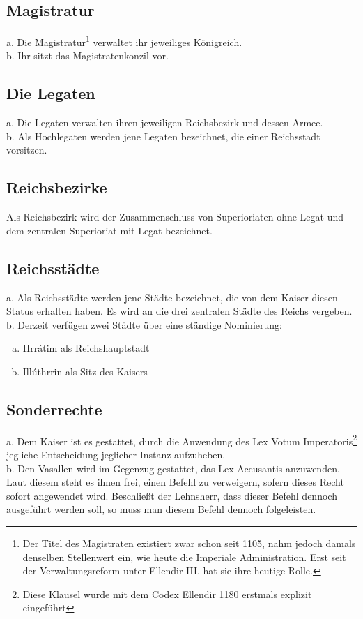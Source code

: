 \documentclass{article}
\begin{document}
\subsection{Magistratur}
a. Die Magistratur\footnote{Der Titel des Magistraten existiert zwar schon seit 1105, nahm jedoch damals denselben Stellenwert ein, wie heute die Imperiale Administration. Erst seit der Verwaltungsreform unter Ellendir III. hat sie ihre heutige Rolle.} verwaltet ihr jeweiliges Königreich.  \\
b. Ihr sitzt das Magistratenkonzil vor.

\subsection{Die Legaten}
a. Die Legaten verwalten ihren jeweiligen Reichsbezirk und dessen Armee.  \\
b. Als Hochlegaten werden jene Legaten bezeichnet, die einer Reichsstadt vorsitzen. 

\subsection{Reichsbezirke}
Als Reichsbezirk wird der Zusammenschluss von Superioriaten ohne Legat und dem zentralen Superioriat mit Legat bezeichnet.  

\subsection{Reichsstädte}
a. Als Reichsstädte werden jene Städte bezeichnet, die von dem Kaiser diesen Status erhalten haben. Es wird an die drei zentralen Städte des Reichs vergeben.  \\
b. Derzeit verfügen zwei Städte über eine ständige Nominierung:  
\begin{enumerate}[a)]
\item Hrrátim als Reichshauptstadt  
\item Illúthrrin als Sitz des Kaisers  
\end{enumerate}

\subsection{Sonderrechte}
a. Dem Kaiser ist es gestattet, durch die Anwendung des Lex Votum Imperatoris\footnote{Diese Klausel wurde mit dem Codex Ellendir 1180 erstmals explizit eingeführt} jegliche Entscheidung jeglicher Instanz aufzuheben.  \\
b. Den Vasallen wird im Gegenzug gestattet, das Lex Accusantis anzuwenden. Laut diesem steht es ihnen frei, einen Befehl zu verweigern, sofern dieses Recht sofort angewendet wird. Beschließt der Lehnsherr, dass dieser Befehl dennoch ausgeführt werden soll, so muss man diesem Befehl dennoch folgeleisten. 
\end{document}
